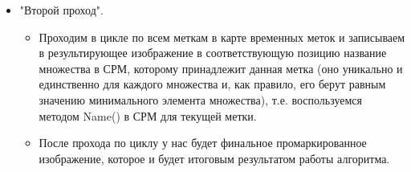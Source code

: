 \documentclass{report}
\begin{document}
\begin{itemize}
\begin{itemize}
\begin{itemize}
\begin{itemize}
			\end{itemize}
			\item "Второй проход"{}.
			\begin{itemize}
				\item Проходим в цикле по всем меткам в карте временных меток и записываем в результирующее изображение в соответствующую позицию название множества в СРМ, которому принадлежит данная метка (оно уникально и единственно для каждого множества и, как правило, его берут равным значению минимального элемента множества), т.е. воспользуемся методом Name() в СРМ для текущей метки.
				\item После прохода по циклу у нас будет финальное промаркированное изображение, которое и будет итоговым результатом работы алгоритма.
			\end{itemize}
		\end{itemize}
	\newpage



\end{itemize}
\end{itemize}
\end{document}
